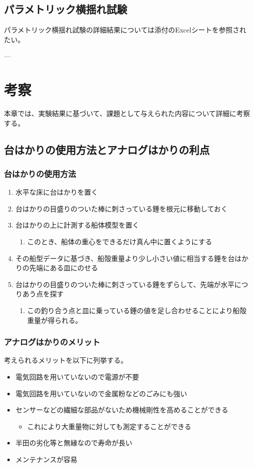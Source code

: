 \documentclass[dvipdfmx,a4paper]{jreport} %
\begin{document}
\section{パラメトリック横揺れ試験}
パラメトリック横揺れ試験の詳細結果については添付のExcelシートを参照されたい。

---

\chapter{考察}
本章では、実験結果に基づいて、課題として与えられた内容について詳細に考察する。

\section{台はかりの使用方法とアナログはかりの利点}
\subsection{台はかりの使用方法}
\begin{enumerate}
  \item 水平な床に台はかりを置く
  \item 台はかりの目盛りのついた棒に刺さっている錘を根元に移動しておく
  \item 台はかりの上に計測する船体模型を置く
  \begin{enumerate}
      \item このとき、船体の重心をできるだけ真ん中に置くようにする
  \end{enumerate}
  \item その船型データに基づき、船殻重量より少し小さい値に相当する錘を台はかりの先端にある皿にのせる
  \item 台はかりの目盛りのついた棒に刺さっている錘をずらして、先端が水平につりあう点を探す
  \begin{enumerate}
      \item この釣り合う点と皿に乗っている錘の値を足し合わせることにより船殻重量が得られる。
  \end{enumerate}
\end{enumerate}

\subsection{アナログはかりのメリット}
考えられるメリットを以下に列挙する。
\begin{itemize}
    \item 電気回路を用いていないので電源が不要
    \item 電気回路を用いていないので金属粉などのごみにも強い
    \item センサーなどの繊細な部品がないため機械剛性を高めることができる
    \begin{itemize}
        \item これにより大重量物に対しても測定することができる
    \end{itemize}
    \item 半田の劣化等と無縁なので寿命が長い
    \item メンテナンスが容易
\end{itemize}
\end{document}
